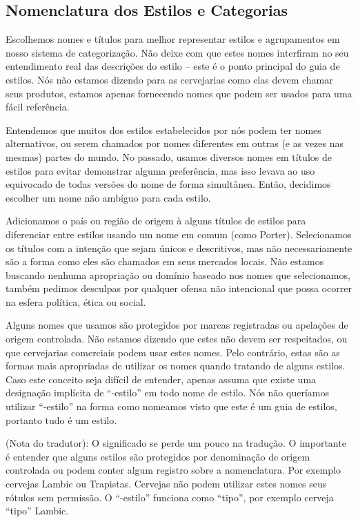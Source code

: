 \subsection*{Nomenclatura dos Estilos e Categorias}
Escolhemos nomes e títulos para melhor representar estilos e agrupamentos em nosso sistema de categorização.  Não deixe com que estes nomes interfiram no seu entendimento real das descrições do estilo – este é o ponto principal do guia de estilos. Nós não estamos dizendo para as cervejarias como elas devem chamar seus produtos, estamos apenas fornecendo nomes que podem ser usados para uma fácil referência.

Entendemos que muitos dos estilos estabelecidos por nós podem ter nomes alternativos, ou serem chamados por nomes diferentes em outras (e as vezes nas mesmas) partes do mundo. No passado, usamos diversos nomes em títulos de estilos para evitar demonstrar alguma preferência, mas isso levava ao uso equivocado de todas versões do nome de forma simultânea. Então, decidimos escolher um nome não ambíguo para cada estilo.

Adicionamos o país ou região de origem à alguns títulos de estilos para diferenciar entre estilos usando um nome em comum (como Porter). Selecionamos os títulos com a intenção que sejam únicos e descritivos, mas não necessariamente são a forma como eles são chamados em seus mercados locais. Não estamos buscando nenhuma apropriação ou domínio baseado nos nomes que selecionamos, também pedimos desculpas por qualquer ofensa não intencional que possa ocorrer na esfera política, ética ou social.

Alguns nomes que usamos são protegidos por marcas registradas ou apelações de origem controlada. Não estamos dizendo que estes não devem ser respeitados, ou que cervejarias comerciais podem usar estes nomes. Pelo contrário, estas são as formas mais apropriadas de utilizar os nomes quando tratando de alguns estilos. Caso este conceito seja difícil de entender, apenas assuma que existe uma designação implícita de “-estilo” em todo nome de estilo. Nós não queríamos utilizar “-estilo” na forma como nomeamos visto que este é um guia de estilos, portanto tudo é um estilo.

(Nota do tradutor): O significado se perde um pouco na tradução. O importante é entender que alguns estilos são protegidos por denominação de origem controlada ou podem conter algum registro sobre a nomenclatura. Por exemplo cervejas Lambic ou Trapistas. Cervejas não podem utilizar estes nomes seus rótulos sem permissão. O “-estilo” funciona como “tipo”, por exemplo cerveja “tipo” Lambic.